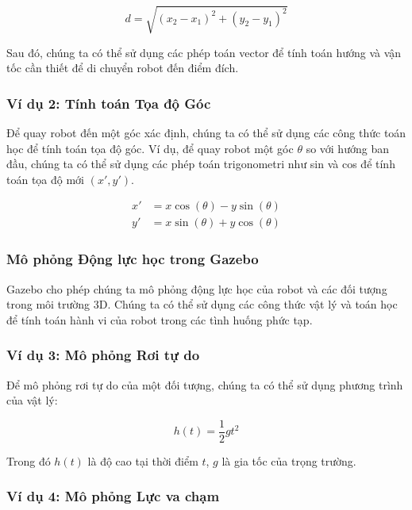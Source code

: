 \begin{equation}
    d = \sqrt{(x_2 - x_1)^2 + (y_2 - y_1)^2}
\end{equation}

Sau đó, chúng ta có thể sử dụng các phép toán vector để tính toán hướng và vận tốc cần thiết để di chuyển robot đến điểm đích.

\subsubsection*{Ví dụ 2: Tính toán Tọa độ Góc}

Để quay robot đến một góc xác định, chúng ta có thể sử dụng các công thức toán học để tính toán tọa độ góc. Ví dụ, để quay robot một góc $\theta$ so với hướng ban đầu, chúng ta có thể sử dụng các phép toán trigonometri như sin và cos để tính toán tọa độ mới $(x', y')$.

\begin{align}
    x' &= x \cos(\theta) - y \sin(\theta) \\
    y' &= x \sin(\theta) + y \cos(\theta)
\end{align}

\subsubsection{Mô phỏng Động lực học trong Gazebo}

Gazebo cho phép chúng ta mô phỏng động lực học của robot và các đối tượng trong môi trường 3D. Chúng ta có thể sử dụng các công thức vật lý và toán học để tính toán hành vi của robot trong các tình huống phức tạp.

\subsubsection*{Ví dụ 3: Mô phỏng Rơi tự do}

Để mô phỏng rơi tự do của một đối tượng, chúng ta có thể sử dụng phương trình của vật lý:

\begin{equation}
    h(t) = \frac{1}{2} g t^2
\end{equation}

Trong đó $h(t)$ là độ cao tại thời điểm $t$, $g$ là gia tốc của trọng trường.

\subsubsection*{Ví dụ 4: Mô phỏng Lực va chạm}


